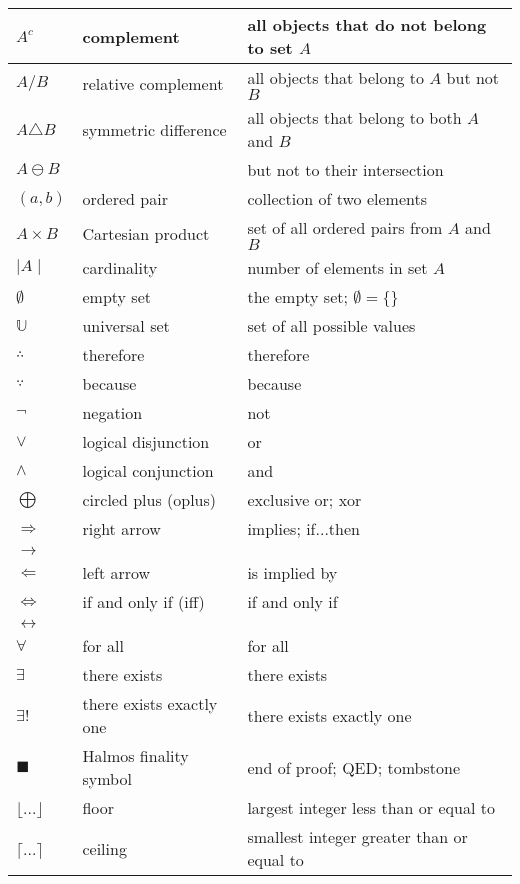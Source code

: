 \documentclass{article}
\begin{document}
\begin{longtable}{|| L{1.7cm} | L{3.5cm} | L{7cm} ||}
\hline
\(A^{c}\) & complement & all objects that do not belong to set \(A\)\\
\hline
\(A \slash B\) & relative complement & all objects that belong to \(A\) but not \(B\)\\
\hline
\(A \triangle B\) & symmetric difference & all objects that belong to both \(A\) and \(B\)\\
\(A \ominus B\) & & but not to their intersection\\
\hline
\((a,b)\) & ordered pair & collection of two elements\\
\hline
\(A \times B\) & Cartesian product & set of all ordered pairs from \(A\) and \(B\)\\
\hline
\(\mid A \mid\) & cardinality & number of elements in set \(A\)\\
\hline
\(\emptyset\) & empty set & the empty set; \(\emptyset = {\{\}}\)\\
\hline
\(\mathbb{U}\) & universal set & set of all possible values\\
\hline
\(\therefore\) & therefore & therefore\\
\hline
\(\because\) & because & because\\
\hline
\(\neg\) & negation & not\\
\hline
\(\vee\) & logical disjunction & or\\
\hline
\(\wedge\) & logical conjunction & and\\
\hline
\(\bigoplus\) & circled plus (oplus) & exclusive or; xor\\
\hline
\(\Rightarrow\) & right arrow & implies; if...then\\
\(\rightarrow\) & & \\
\hline
\(\Leftarrow\) & left arrow & is implied by\\
\hline
\(\Leftrightarrow\) & if and only if (iff) & if and only if\\
\(\leftrightarrow\) & & \\
\hline
\(\forall\) & for all & for all\\
\hline
\(\exists\) & there exists & there exists\\
\hline
\(\exists!\) & there exists exactly one & there exists exactly one\\
\hline
\(\blacksquare\) & Halmos finality symbol & end of proof; QED; tombstone\\
\hline
\(\lfloor\)...\(\rfloor\) & floor & largest integer less than or equal to\\
\hline
\(\lceil\)...\(\rceil\) & ceiling & smallest integer greater than or equal to\\

\end{longtable}
\end{document}
